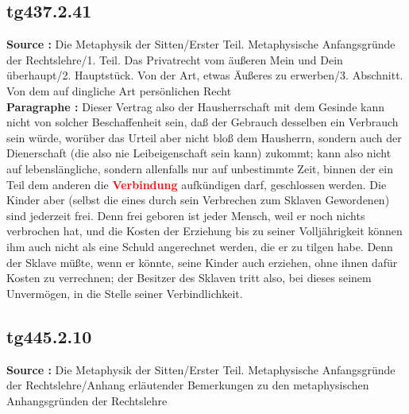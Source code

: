 \documentclass[a4paper,12pt,twoside]{book}
\newcommand{\match}[1]{\textcolor{red}{\textbf{#1}}}
\begin{document}
	\subsection*{tg437.2.41} 
	\textbf{Source : }Die Metaphysik der Sitten/Erster Teil. Metaphysische Anfangsgründe der Rechtslehre/1. Teil. Das Privatrecht vom äußeren Mein und Dein überhaupt/2. Hauptstück. Von der Art, etwas Äußeres zu erwerben/3. Abschnitt. Von dem auf dingliche Art persönlichen Recht\\  
	
	\textbf{Paragraphe : }Dieser Vertrag also der Hausherrschaft mit dem Gesinde kann nicht von solcher Beschaffenheit sein, daß der Gebrauch desselben ein Verbrauch sein würde, worüber das Urteil aber nicht bloß dem Hausherrn, sondern auch der Dienerschaft (die also nie Leibeigenschaft sein kann) zukommt; kann also nicht auf lebenslängliche, sondern allenfalls nur auf unbestimmte Zeit, binnen der ein Teil dem anderen die \match{Verbindung} aufkündigen darf, geschlossen werden. Die Kinder aber (selbst die eines durch sein Verbrechen zum Sklaven Gewordenen) sind jederzeit frei. Denn frei geboren ist jeder Mensch, weil er noch nichts verbrochen hat, und die Kosten der Erziehung bis zu seiner Volljährigkeit können ihm auch nicht als eine Schuld angerechnet werden, die er zu tilgen habe. Denn der Sklave müßte, wenn er könnte, seine Kinder auch erziehen, ohne ihnen dafür Kosten zu verrechnen; der Besitzer des Sklaven tritt also, bei dieses seinem Unvermögen, in die Stelle seiner Verbindlichkeit. 
	
	\subsection*{tg445.2.10} 
	\textbf{Source : }Die Metaphysik der Sitten/Erster Teil. Metaphysische Anfangsgründe der Rechtslehre/Anhang erläutender Bemerkungen zu den metaphysischen Anhangsgründen der Rechtslehre\\  
	
\end{document}

